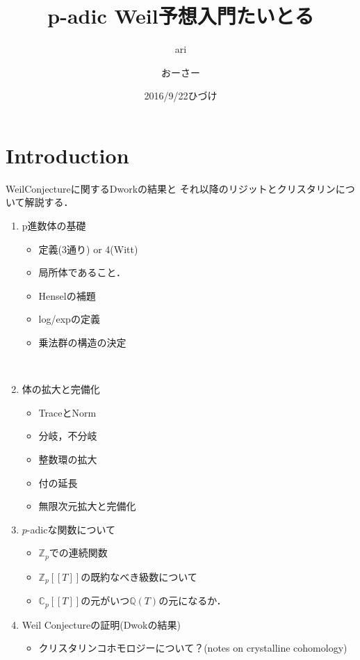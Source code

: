 \documentclass{ujarticle}
\author{ari}
\title{p-adic Weil予想入門}
\date{2016/9/22}
\title{たいとる}
\author{おーさー}
\date{ひづけ}
\begin{document}
\maketitle
\tableofcontents





\section{Introduction}
\label{sec:Introduction}
WeilConjectureに関するDworkの結果と
それ以降のリジットとクリスタリンについて解説する．
\begin{enumerate}
  \item p進数体の基礎
  \begin{itemize}
    \item 定義(3通り) or 4(Witt)
    \item 局所体であること．
    \item Henselの補題
    \item log/expの定義
    \item 乗法群の構造の決定
  \end{itemize}
　\item 体の拡大と完備化
   \begin{itemize}
     \item TraceとNorm
     \item 分岐，不分岐
     \item 整数環の拡大
     \item 付の延長
     \item 無限次元拡大と完備化
   \end{itemize}
   \item $p$-adicな関数について
    \begin{itemize}
      \item $\mathbb{Z}_p$での連続関数
      \item $\mathbb{Z}_p[[T]]$の既約なべき級数について
      \item $\mathbb{C}_p[[T]]$の元がいつ$\mathbb{Q}(T)$の元になるか．
    \end{itemize}
    \item Weil Conjectureの証明(Dwokの結果)
    \begin{itemize}
      \item クリスタリンコホモロジーについて？(notes on crystalline cohomology)
    \end{itemize}
\end{enumerate}
\end{document}
